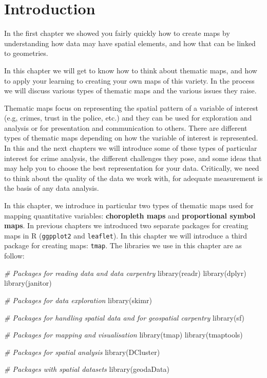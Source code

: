 \documentclass[
]{book}
\newenvironment{Shaded}{\begin{snugshade}}{\end{snugshade}}
\newcommand{\CommentTok}[1]{\textcolor[rgb]{0.56,0.35,0.01}{\textit{#1}}}
\newcommand{\FunctionTok}[1]{\textcolor[rgb]{0.00,0.00,0.00}{#1}}
\newcommand{\NormalTok}[1]{#1}
\begin{document}
\hypertarget{introduction-3}{%
\section{Introduction}\label{introduction-3}}

In the first chapter we showed you fairly quickly how to create maps by understanding how data may have spatial elements, and how that can be linked to geometries.

In this chapter we will get to know how to think about thematic maps, and how to apply your learning to creating your own maps of this variety. In the process we will discuss various types of thematic maps and the various issues they raise.

Thematic maps focus on representing the spatial pattern of a variable of interest (e.g, crimes, trust in the police, etc.) and they can be used for exploration and analysis or for presentation and communication to others. There are different types of thematic maps depending on how the variable of interest is represented. In this and the next chapters we will introduce some of these types of particular interest for crime analysis, the different challenges they pose, and some ideas that may help you to choose the best representation for your data. Critically, we need to think about the quality of the data we work with, for adequate measurement is the basis of any data analysis.

In this chapter, we introduce in particular two types of thematic maps used for mapping quantitative variables: \textbf{choropleth maps} and \textbf{proportional symbol maps}. In previous chapters we introduced two separate packages for creating maps in R (\texttt{ggpplot2} and \texttt{leaflet}). In this chapter we will introduce a third package for creating maps: \texttt{tmap}. The libraries we use in this chapter are as follow:

\begin{Shaded}
\begin{Highlighting}[]
\CommentTok{\# Packages for reading data and data carpentry}
\FunctionTok{library}\NormalTok{(readr)}
\FunctionTok{library}\NormalTok{(dplyr)}
\FunctionTok{library}\NormalTok{(janitor)}

\CommentTok{\# Packages for data exploration}
\FunctionTok{library}\NormalTok{(skimr)}

\CommentTok{\# Packages for handling spatial data and for geospatial carpentry}
\FunctionTok{library}\NormalTok{(sf)}

\CommentTok{\# Packages for mapping and visualisation}
\FunctionTok{library}\NormalTok{(tmap)}
\FunctionTok{library}\NormalTok{(tmaptools)}

\CommentTok{\# Packages for spatial analysis}
\FunctionTok{library}\NormalTok{(DCluster)}

\CommentTok{\# Packages with spatial datasets}
\FunctionTok{library}\NormalTok{(geodaData)}
\end{Highlighting}
\end{Shaded}
\end{document}
